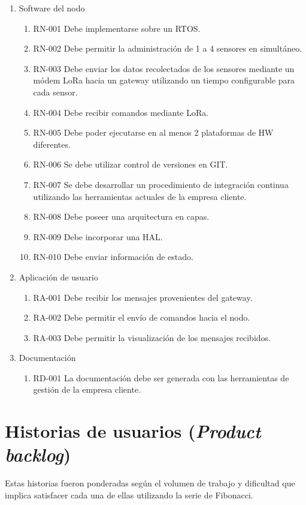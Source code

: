 \documentclass[11pt]{charter}
\begin{document}
\begin{enumerate}
\item Software del nodo
	\begin{enumerate}
	\item RN-001 Debe implementarse sobre un RTOS.
	\item RN-002 Debe permitir la administración de 1 a 4 sensores en simultáneo.
	\item RN-003 Debe enviar los datos recolectados de los sensores mediante un módem LoRa hacia un gateway utilizando un tiempo configurable para cada sensor.
	\item RN-004 Debe recibir comandos mediante LoRa.	
	\item RN-005 Debe poder ejecutarse en al menos 2 plataformas de HW diferentes.
	\item RN-006 Se debe utilizar control de versiones en GIT.
	\item RN-007 Se debe desarrollar un procedimiento de integración continua utilizando las herramientas actuales de la empresa cliente.
	\item RN-008 Debe poseer una arquitectura en capas.
	\item RN-009 Debe incorporar una HAL.
	\item RN-010 Debe enviar información de estado.
	\end{enumerate}
\item Aplicación de usuario
	\begin{enumerate}
	\item RA-001 Debe recibir los mensajes provenientes del gateway.
	\item RA-002 Debe permitir el envío de comandos hacia el nodo.
	\item RA-003 Debe permitir la visualización de los mensajes recibidos.
	\end{enumerate}
\item Documentación
	\begin{enumerate}
	\item RD-001 La documentación debe ser generada con las herramientas de gestión de la empresa cliente.
	\end{enumerate}
\end{enumerate}

\section{Historias de usuarios (\textit{Product backlog})}
\label{sec:backlog}

Estas historias fueron ponderadas según el volumen de trabajo y dificultad que implica satisfacer cada una de ellas utilizando la serie de Fibonacci.
\end{document}
